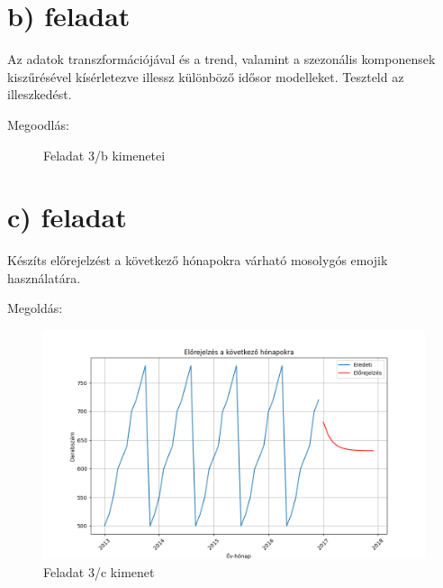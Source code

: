 \documentclass[11pt,a4paper,oneside]{report}
\begin{document}
\section{b) feladat}
Az adatok transzformációjával és a trend, valamint a szezonális komponensek kiszűrésével kísérletezve illessz különböző idősor modelleket. Teszteld az illeszkedést.

Megoodlás:

\begin{figure}%
  \centering
  \qquad
  \caption{Feladat 3/b kimenetei}%
  \label{fig:example}%
\end{figure}

\section{c) feladat}
Készíts előrejelzést a következő hónapokra várható mosolygós emojik használatára.

Megoldás:

\begin{figure}[!ht]
  \begin{center}
    \includegraphics[scale=0.4]{Figure_6.png}
    \caption{Feladat 3/c kimenet}
    \label{fig:TexnicCenter}
  \end{center}
\end{figure}
\end{document}
